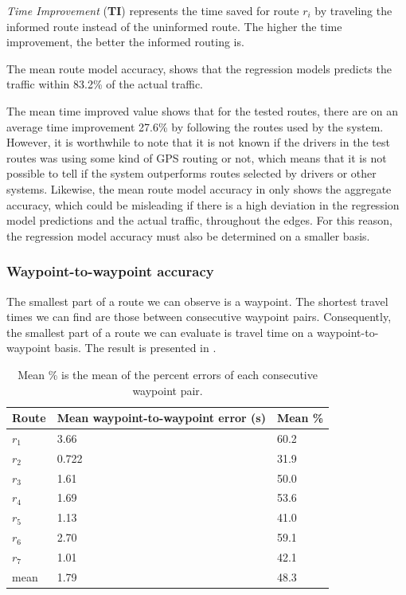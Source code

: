 \emph{Time Improvement} (\textbf{TI}) represents the time saved for route $r_i$ by traveling the informed route instead of the uninformed route. The higher the time improvement, the better the informed routing is.

The mean route model accuracy, shows that the regression models predicts the traffic within 83.2\% of the actual traffic. 

The mean time improved value shows that for the tested routes, there are on an average time improvement 27.6\% by following the routes used by the system. However, it is worthwhile to note that it is not known if the drivers in the test routes was using some kind of GPS routing or not, which means that it is not possible to tell if the system outperforms routes selected by drivers or other systems. Likewise, the mean route model accuracy in  only shows the aggregate accuracy, which could be misleading if there is a high deviation in the regression model predictions and the actual traffic, throughout the edges. For this reason, the regression model accuracy must also be determined on a smaller basis.

\subsubsection{Waypoint-to-waypoint accuracy}
The smallest part of a route we can observe is a waypoint. The shortest travel times we can find are those between consecutive waypoint pairs. Consequently, the smallest part of a route we can evaluate is travel time on a waypoint-to-waypoint basis. The result is presented in .

\begin{table}[H]
	\centering
	\begin{tabular}{lll}
		\textbf{Route} & \textbf{Mean waypoint-to-waypoint error (s)}    & \textbf{Mean \%} \\ \hline
		$r_1$          & 3.66                                             & 60.2 \\
		$r_2$          & 0.722                                            & 31.9 \\
		$r_3$          & 1.61                                             & 50.0 \\
		$r_4$          & 1.69                                             & 53.6 \\
		$r_5$          & 1.13                                             & 41.0 \\
		$r_6$          & 2.70                                             & 59.1 \\
		$r_7$          & 1.01                                             & 42.1 \\ \hline
		mean           & 1.79                                             & 48.3
	\end{tabular}
	\caption{Mean \% is the mean of the percent errors of each consecutive waypoint pair.}
	\label{tab:eval-results-2}
\end{table}


